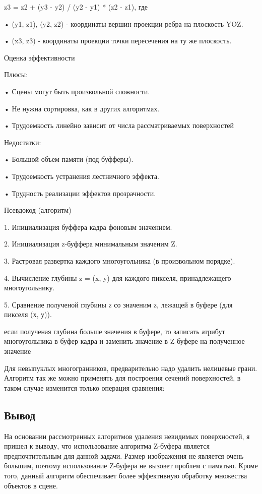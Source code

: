 z3 = z2 + (y3 - y2) / (y2 - y1) * (z2 - z1), где
    
    • (y1, z1), (y2, z2) - координаты вершин проекции ребра на плоскость YOZ.
    
    • (x3, z3) - координаты проекции точки пересечения на ту же плоскость.

Оценка эффективности

Плюсы:

    • Сцены могут быть произвольной сложности.
    
    • Не нужна сортировка, как в других алгоритмах.
    
    • Трудоемкость линейно зависит от числа рассматриваемых поверхностей
    
Недостатки:

    • Большой объем памяти (под буфферы).
    
    • Трудоемкость устранения лестничного эффекта.
    
    • Трудность реализации эффектов прозрачности.
    
Псевдокод (алгоритм)

1. Инициализация буффера кадра фоновым значением.

2. Инициализация z-буффера минимальным значеним Z.

3. Растровая развертка каждого многоугольника (в произвольном порядке).

4. Вычисление глубины z = (x, y) для каждого пикселя, принадлежащего многоугольнику.

5. Сравнение полученой глубины z со значеним z, лежащей в буфере (для пикселя (х, у)).

   если полученая глубина больше значения в буфере, то записать атрибут многоугольника
   в буфер кадра и заменить значение в Z-буфере на полученное значение

Для невыпуклых многогранников, предварительно надо удалить нелицевые грани.
Алгоритм так же можно применять для построения сечений поверхностей, в таком случае изменится только операция сравнения:
 
\subsection{Вывод}

 На основании рассмотренных алгоритмов удаления невидимых поверхностей, я пришел к выводу, что использование алгоритма Z-буфера является предпочтительным для данной задачи. Размер изображения не является очень большим, поэтому использование Z-буфера не вызовет проблем с памятью. Кроме того, данный алгоритм обеспечивает более эффективную обработку множества объектов в сцене.

